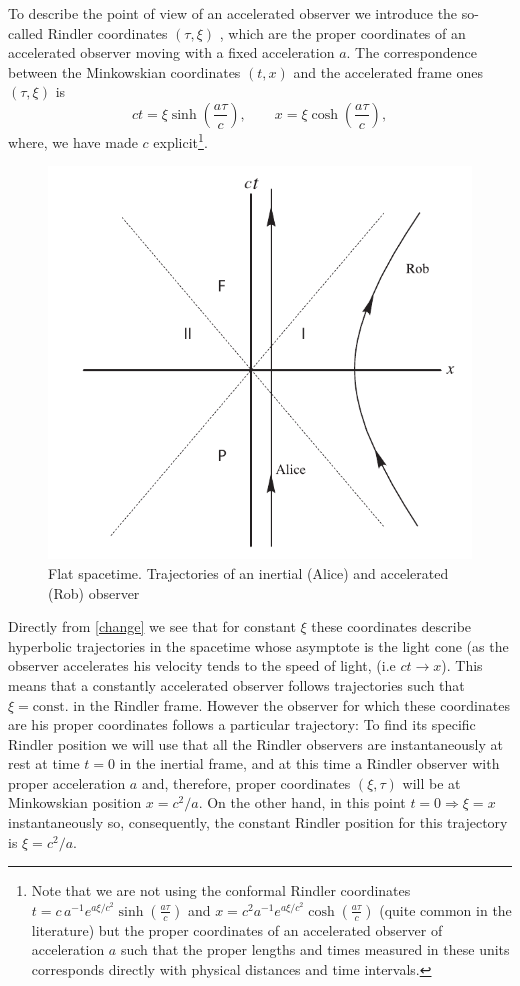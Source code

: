 To describe the point of view of an accelerated observer we introduce the so-called Rindler coordinates $(\tau,\xi)$ \cite{gravitation}, which are the proper coordinates of an accelerated observer moving with a fixed acceleration $a$. The correspondence between the Minkowskian coordinates $(t,x)$ and the accelerated frame ones $(\tau,\xi)$ is 
\begin{equation}\label{change}
ct=\xi \sinh\left(\frac{a\tau}{c}\right),\qquad x=\xi\cosh\left(\frac{a\tau}{c}\right),
\end{equation}
where, we have made $c$ explicit\footnote{Note that we are not using the conformal Rindler coordinates $t=c\,a^{-1}e^{a\xi/c^2}\sinh\left(\frac{a\tau}{c}\right)$ and $x=c^{2}a^{-1}e^{a\xi/c^2}\cosh\left(\frac{a\tau}{c}\right)$ (quite common in the literature) but the proper coordinates of an accelerated observer of acceleration $a$ such that the proper lengths and times measured in these units corresponds directly with physical distances and time intervals.}.  
\begin{figure}[H]
\begin{center}
\includegraphics[width=.70\textwidth]{rin2}
\end{center}
\caption{Flat spacetime. Trajectories of an inertial (Alice) and accelerated (Rob) observer}
\label{rin2}
\end{figure}

Directly from \eqref{change} we see that for constant $\xi$ these coordinates describe hyperbolic trajectories in the spacetime whose asymptote is the light cone (as the observer accelerates his velocity tends to the speed of light, (i.e $ct\rightarrow x$). This means that a constantly accelerated observer follows trajectories such that $\xi=\text{const.}$ in the Rindler frame. However the observer for which these coordinates are his proper coordinates follows a particular trajectory:  To find its specific Rindler position we will use that all the Rindler observers are instantaneously at rest at time $t=0$ in the inertial frame, and at this time a Rindler observer with proper acceleration $a$ and, therefore, proper coordinates $(\xi,\tau)$ will be at Minkowskian position $x=c^2/a$. On the other hand, in this point $t=0\Rightarrow\xi=x$ instantaneously so, consequently, the constant Rindler position for this trajectory is $\xi= c^2/a$.

